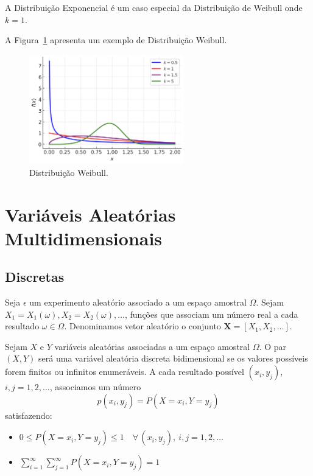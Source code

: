 \documentclass{article}
\begin{document}
A Distribuição Exponencial é um caso especial da Distribuição de Weibull onde $k = 1$.

A Figura~\ref{fig:dist_cont_weibull} apresenta um exemplo de Distribuição Weibull.

\begin{figure}[H]
    \centering    \includegraphics[width=0.6\textwidth]{figuras/dist_cont_weibull.png}
    \caption{Distribuição Weibull.}
    \label{fig:dist_cont_weibull}
\end{figure}

\section{Variáveis Aleatórias Multidimensionais}
\subsection{Discretas}
Seja $\epsilon$ um experimento aleatório associado a um espaço amostral $\Omega$. Sejam $X_1 = X_1(\omega), X_2 = X_2(\omega), \ldots$, funções que associam um número real a cada resultado $\omega \in \Omega$. 
Denominamos vetor aleatório o conjunto $\mathbf{X} = [X_1, X_2, \ldots]$.

Sejam $X$ e $Y$ variáveis aleatórias associadas a um espaço amostral $\Omega$. O par $(X, Y)$ será uma variável aleatória discreta bidimensional se os valores possíveis forem finitos ou infinitos enumeráveis.  A cada resultado possível $(x_i, y_j)$, $i, j = 1, 2, \ldots$, associamos um número
    $$
    p(x_i, y_j) = P(X = x_i, Y = y_j)
    $$
satisfazendo:
\begin{itemize}
    \item $0 \leq P(X = x_i, Y = y_j) \leq 1 \quad \forall\,(x_i, y_j),\ i, j = 1, 2, \ldots$
    \item $\displaystyle \sum_{i=1}^{\infty} \sum_{j=1}^{\infty} P(X = x_i, Y = y_j) = 1$
\end{itemize}
\end{document}
